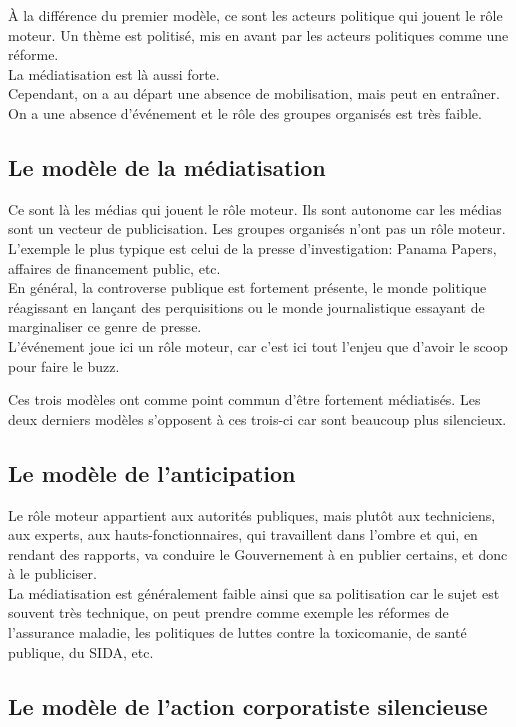 \documentclass[10pt, a4paper, openany]{book}
\begin{document}
À la différence du premier modèle, ce sont les acteurs politique qui jouent le rôle moteur. Un thème est politisé, mis en avant par les acteurs politiques comme une réforme. \\
La médiatisation est là aussi forte. \\
Cependant, on a au départ une absence de mobilisation, mais peut en entraîner. \\
On a une absence d'événement et le rôle des groupes organisés est très faible. 

\subsection{Le modèle de la médiatisation}

Ce sont là les médias qui jouent le rôle moteur. Ils sont autonome car les médias sont un vecteur de publicisation. Les groupes organisés n'ont pas un rôle moteur. \\
L'exemple le plus typique est celui de la presse d'investigation: Panama Papers, affaires de financement public, etc. \\
En général, la controverse publique est fortement présente, le monde politique réagissant en lançant des perquisitions ou le monde journalistique essayant de marginaliser ce genre de presse. \\
L'événement joue ici un rôle moteur, car c'est ici tout l'enjeu que d'avoir le scoop pour faire le buzz. 


Ces trois modèles ont comme point commun d'être fortement médiatisés. Les deux derniers modèles s'opposent à ces trois-ci car sont beaucoup plus silencieux.


\subsection{Le modèle de l'anticipation}

Le rôle moteur appartient aux autorités publiques, mais plutôt aux techniciens, aux experts, aux hauts-fonctionnaires, qui travaillent dans l'ombre et qui, en rendant des rapports, va conduire le Gouvernement à en publier certains, et donc à le publiciser. \\
La médiatisation est généralement faible ainsi que sa politisation car le sujet est souvent très technique, on peut prendre comme exemple les réformes de l'assurance maladie, les politiques de luttes contre la toxicomanie, de santé publique, du SIDA, etc. 

\subsection{Le modèle de l'action corporatiste silencieuse}
\end{document}
